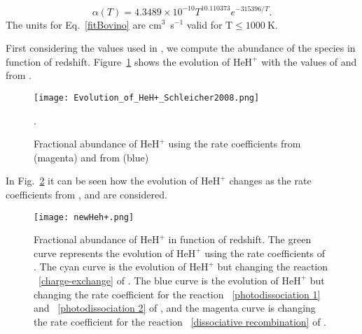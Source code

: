 \documentclass[baaa]{baaa}
\begin{document}
\begin{equation}\label{fitBovino}
    \alpha(T) =4.3489 \times 10^{-10} T^{10.110373} e^{-315396/T}.
\end{equation}
The units for Eq.~\ref{fitBovino} are cm$^3$~s$^{-1}$ valid for $\mathrm{T} \leq 1000~\mathrm{K}$.

First considering the values used in \citet{Schleicher2008}, we compute the abundance of the species in function of redshift. Figure~\ref{Schleicher} shows the evolution of $\mathrm{HeH^+}$ with the values of \citet{GP98} and from \citet{Schleicher2008}.

\begin{figure}[h!]
    \centering
    \texttt{[image: Evolution\_of\_HeH+\_Schleicher2008.png]}
    \caption{Fractional abundance of $\mathrm{HeH^+}$ using the rate coefficients from \citet{GP98}(magenta) and from \citet{Schleicher2008}(blue)}.
    \label{Schleicher}
\end{figure}

In Fig.~\ref{NewrateCoeff} it can be seen how the evolution of $\mathrm{HeH^+}$ changes as the rate coefficients from \citet{Bovino2011}, \citet{Coppola2017} and \citet{Novotny2019} are considered. 

\begin{figure}[h!]
   \centering
    \texttt{[image: newHeh+.png]}
    \caption{Fractional abundance of $\mathrm{HeH^+}$ in function of redshift. The green curve represents the evolution of $\mathrm{HeH^+}$ using the rate coefficients of \citet{Schleicher2008}. The cyan curve is the evolution of $\mathrm{HeH^+}$ but changing the reaction ~\ref{charge-exchange} of \citet{Bovino2011}. The blue curve is the evolution of $\mathrm{HeH^+}$ but changing the rate coefficient for the reaction ~\ref{photodissociation 1} and ~\ref{photodissociation 2} of \citet{Coppola2017}, and the magenta curve is changing the rate coefficient for the reaction ~\ref{dissociative recombination} of \citet{Novotny2019}.}

    \label{NewrateCoeff}
\end{figure}
\end{document}
